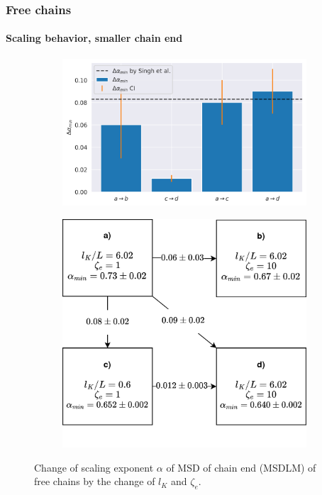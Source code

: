 \documentclass[handout]{beamer}
\begin{document}

\begin{frame}
    \frametitle{Free chains}
    \framesubtitle{Scaling behavior, smaller chain end}
    \begin{figure}
        \centering
        \begin{subfigure}{0.58\textwidth}
            \centering
            \includegraphics[width=\textwidth]{17+18+19+20-exp-delta_alpha_min_fm.png}
        \end{subfigure}
        \begin{subfigure}{0.4\textwidth}
            \centering
            \includegraphics[width=\textwidth]{cases_diag.png}
        \end{subfigure}
        \caption{
            Change of scaling exponent $\alpha$ of MSD of chain end (MSDLM)
            of free chains by the change of $l_K$ and $\zeta_e$.
        }
    \end{figure}
\end{frame}
\end{document}
